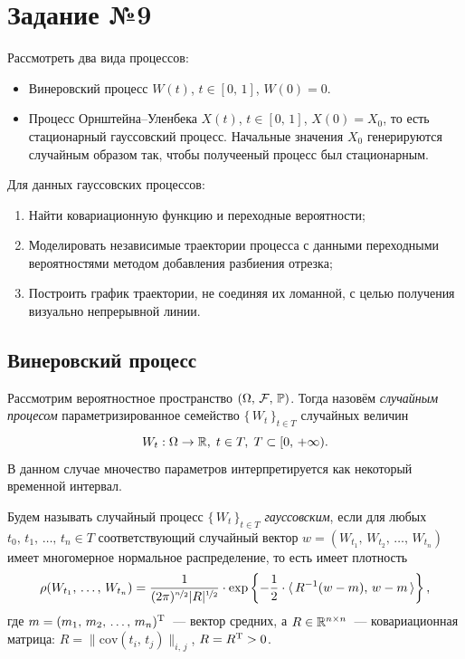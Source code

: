 \section{Задание №9}

Рассмотреть два вида процессов:
\begin{itemize}
        \item Винеровский процесс $W(t)$, $t \in [0,\,1]$, $W(0) = 0$.
        \item Процесс Орнштейна--Уленбека $X(t)$, $t \in [0,\,1]$, $X(0) = X_0$, то есть стационарный гауссовский процесс. Начальные значения $X_0$ генерируются случайным образом так, чтобы получееный процесс был стационарным.
\end{itemize}
Для данных гауссовских процессов:
\begin{enumerate}
        \item Найти ковариационную функцию и переходные вероятности;
        \item Моделировать независимые траектории процесса с данными переходными вероятностями методом добавления разбиения отрезка;
        \item Построить график траектории, не соединяя их ломанной, с целью получения визуально непрерывной линии.
\end{enumerate}


\subsection{Винеровский процесс}

\begin{definition}
        Рассмотрим вероятностное пространство $(\Omega,\,\mathcal{F},\,\mathbb{P})$. Тогда назовём \textit{случайным процесом} параметризированное семейство $\{\,W_t\,\}_{t \in T}$ случайных величин 
$$
        W_t:\Omega\to\mathbb{R},\;t\in T,\;T \subset [0,\,+\infty).
$$
        В данном случае мночество параметров интерпретируется как некоторый временной интервал.
\end{definition}

\begin{definition}
        Будем называть случайный процесс $\{\,W_t\,\}_{t\in T}$ \textit{гауссовским}, если для любых $t_0,\,t_1,\,\ldots,\,t_n\in T$ соответствующий случайный вектор $w = (W_{t_1},\,W_{t_2},\,\ldots,\,W_{t_n})$ имеет многомерное нормальное распределение, то есть имеет плотность
$$
        \rho(W_{t_1},\,\ldots,\,W_{t_n})
=
        \frac{1}{(2\pi)^{\nicefrac{n}{2}}|R|^{\nicefrac{1}{2}}}
\cdot
        \exp\left\{
-\frac{1}{2} \cdot
\langle\, R^{-1}(w - m),\, w - m\,\rangle
        \right\},
$$
        где $m = (m_1,\,m_2,\,\ldots,\,m_n)^{\mathrm{T}}$~--- вектор средних, а $R \in \mathbb{R}^{n \times n}$~--- ковариационная матрица: $R = \|\mbox{cov}(t_i,\,t_j)\|_{i,\,j}$, $R = R^{\mathrm{T}} > 0$.
\end{definition}

